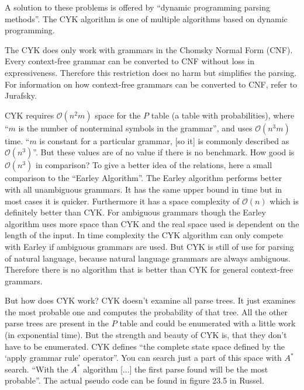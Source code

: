 \documentclass[12pt,twoside]{scrartcl}
\theoremstyle{plain}
\theoremstyle{definition}
\theoremstyle{remark}
\begin{document}
		A solution to these problems is offered by ``dynamic programming parsing methods''\cite[p.~469]{Jurafsky2009b}. The CYK algorithm is one of multiple algorithms based on dynamic programming.
		
		The CYK does only work with grammars in the Chomsky Normal Form (CNF). Every context-free grammar can be converted to CNF without loss in expressiveness. Therefore this restriction does no harm but simplifies the parsing. For information on how context-free grammars can be converted to CNF, refer to Jurafsky\cite{Jurafsky2009b}.
		
		CYK requires $\mathcal{O}(n^{2}m)$ space for the $P$ table (a table with probabilities), where ``$m$ is the number of nonterminal symbols in the grammar''\cite[p.~893]{Russel2010}, and uses $\mathcal{O}(n^{3}m)$ time. ``$m$ is constant for a particular grammar, [so it] is commonly described as $\mathcal{O}(n^{3})$''\cite[p.~893]{Russel2010}. But these values are of no value if there is no benchmark. How good is $\mathcal{O}(n^{3})$ in comparison? To give a better idea of the relations, here a small comparison to the ``Earley Algorithm''\cite[p.~477]{Jurafsky2009b}. The Earley algorithm performs better with all unambiguous grammars.\cite{Li} It has the same upper bound in time but in most cases it is quicker. Furthermore it has a space complexity of $\mathcal{O}(n)$ which is definitely better than CYK.\cite{Li} For ambiguous grammars though the Earley algorithm uses more space than CYK and the real space used is dependent on the length of the input.\cite{Li} In time complexity the CYK algorithm can only compete with Earley if ambiguous grammars are used.\cite{Li} But CYK is still of use for parsing of natural language, because natural language grammars are always ambiguous. Therefore there is no algorithm that is better than CYK for general context-free grammars.\cite{Russel2010}
		
		But how does CYK work? CYK doesn't examine all parse trees. It just examines the most probable one and computes the probability of that tree. All the other parse trees are present in the $P$ table and could be enumerated with a little work (in exponential time). But the strength and beauty of CYK is, that they don't have to be enumerated. CYK defines ``the complete state space defined by the `apply grammar rule' operator''\cite[p.~894]{Russel2010}. You can search just a part of this space with $A^{*}$ search.\cite{Russel2010} ``With the $A^{*}$ algorithm [...] the first parse found will be the most probable''\cite[p.~895]{Russel2010}. The actual pseudo code can be found in figure 23.5 in Russel\cite[p.~894]{Russel2010}.
		
\end{document}

